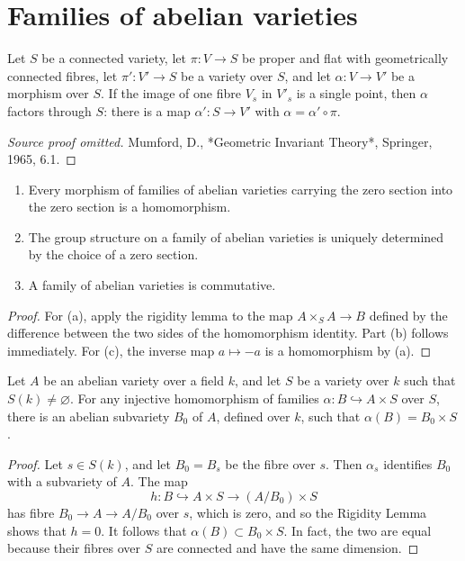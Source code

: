 \section{Families of abelian varieties}
\begin{proposition}\label{prop:milne-rigidity}
Let $S$ be a connected variety, let $\pi:V\to S$ be proper and flat with
geometrically connected fibres, let $\pi':V'\to S$ be a variety over $S$,
and let $\alpha:V\to V'$ be a morphism over $S$.  If the image of one fibre
$V_s$ in $V'_s$ is a single point, then $\alpha$ factors through $S$: there is
a map $\alpha':S\to V'$ with $\alpha=\alpha'\circ\pi$.
\end{proposition}
\begin{proof}[Source proof omitted]
Mumford, D., *Geometric Invariant Theory*, Springer, 1965, 6.1.
\end{proof}
\begin{corollary}\label{cor:milne-family-homomorphism}
\begin{enumerate}
\item Every morphism of families of abelian varieties carrying the zero
section into the zero section is a homomorphism.
\item The group structure on a family of abelian varieties is uniquely
determined by the choice of a zero section.
\item A family of abelian varieties is commutative.
\end{enumerate}
\end{corollary}
\begin{proof}
For (a), apply the rigidity lemma to the map
$A\times_SA\to B$ defined by the difference between the two sides of the
homomorphism identity.  Part (b) follows immediately.  For (c), the inverse
map $a\mapsto-a$ is a homomorphism by (a).
\end{proof}
\begin{proposition}\label{prop:milne-constant-family-subvariety}
Let $A$ be an abelian variety over a field $k$, and let $S$ be a variety over
$k$ such that $S(k)\ne\varnothing$.  For any injective homomorphism of
families $\alpha:B\hookrightarrow A\times S$ over $S$, there is an abelian
subvariety $B_0$ of $A$, defined over $k$, such that
$\alpha(B)=B_0\times S$.
\end{proposition}
\begin{proof}
Let $s\in S(k)$, and let $B_0=B_s$ be the fibre over $s$.  Then $\alpha_s$
identifies $B_0$ with a subvariety of $A$.  The map
\[
h:B\hookrightarrow A\times S\longrightarrow (A/B_0)\times S
\]
has fibre $B_0\to A\to A/B_0$ over $s$, which is zero, and so the Rigidity
Lemma shows that $h=0$.  It follows that $\alpha(B)\subset B_0\times S$.
In fact, the two are equal because their fibres over $S$ are connected and
have the same dimension.
\end{proof}

